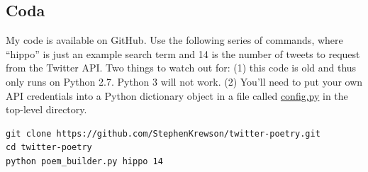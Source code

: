 \documentclass[a0,final]{a0poster}
\begin{document}
\begin{multicols}{3}
\section*{Coda}
My code is available on GitHub. Use the following series of commands, where ``hippo'' is just an example search term and 14 is the number of tweets to request from the Twitter API. Two things to watch out for: (1) this code is old and thus only runs on Python 2.7. Python 3 will not work. (2) You'll need to put your own API credentials into a Python dictionary object in a file called \url{config.py} in the top-level directory.\\

\begin{verbatim}
git clone https://github.com/StephenKrewson/twitter-poetry.git
cd twitter-poetry
python poem_builder.py hippo 14
\end{verbatim}





\end{multicols}
\end{document}
